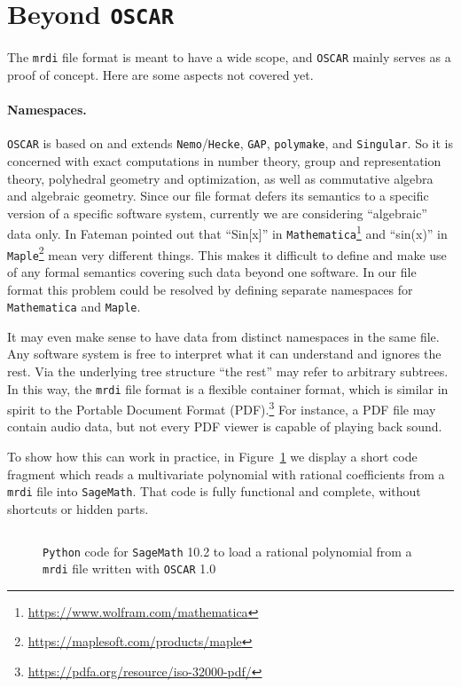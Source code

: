 \documentclass[runningheads]{llncs}
\newcommand\polymake{\texttt{polymake}\xspace}
\newcommand\OSCAR{\texttt{OSCAR}\xspace}
\newcommand\Python{\texttt{Python}\xspace}
\newcommand\Mathematica{\texttt{Mathematica}\xspace}
\newcommand\Maple{\texttt{Maple}\xspace}
\newcommand\Nemo{\texttt{Nemo}\xspace}
\newcommand\Hecke{\texttt{Hecke}\xspace}
\newcommand\GAP{\texttt{GAP}\xspace}
\newcommand\Singular{\texttt{Singular}\xspace}
\newcommand\SageMath{\texttt{SageMath}\xspace}
\begin{document}
\section{Beyond \OSCAR}
\label{sec:beyond}

The \texttt{mrdi} file format is meant to have a wide scope, and \OSCAR mainly serves as a proof of concept.
Here are some aspects not covered yet.
\paragraph{Namespaces.}
\OSCAR is based on and extends \Nemo/\Hecke \cite{nemo}, \GAP \cite{GAP4}, \polymake, and \Singular \cite{DGPS}.
So it is concerned with exact computations in number theory, group and representation theory, polyhedral geometry and optimization, as well as commutative algebra and algebraic geometry. 
Since our file format defers its semantics to a specific version of a specific software system, currently we are considering \enquote{algebraic} data only.
In \cite{Fateman:2001} Fateman pointed out that \enquote{Sin[x]} in \Mathematica\footnote{\url{https://www.wolfram.com/mathematica}} and \enquote{sin(x)} in \Maple\footnote{\url{https://maplesoft.com/products/maple}} mean very different things.
This makes it difficult to define and make use of any formal semantics covering such data beyond one software.
In our file format this problem could be resolved by defining separate namespaces for \Mathematica and \Maple.

It may even make sense to have data from distinct namespaces in the same file.
Any software system is free to interpret what it can understand and ignores the rest.
Via the underlying tree structure \enquote{the rest} may refer to arbitrary subtrees.
In this way, the \texttt{mrdi} file format is a flexible container format, which is similar in spirit to the Portable Document Format (PDF).\footnote{\url{https://pdfa.org/resource/iso-32000-pdf/}}
For instance, a PDF file may contain audio data, but not every PDF viewer is capable of playing back sound.

To show how this can work in practice, in Figure~\ref{fig:sage} we display a short code fragment which reads a multivariate polynomial with rational coefficients from a \texttt{mrdi} file into \SageMath \cite{william_stein_2020_4066866}.
That code is fully functional and complete, without shortcuts or hidden parts.

\begin{figure}[th]
  \inputminted[fontsize=\footnotesize]{py}{load_oscar_polynomial.py}
  \caption{\Python code for \SageMath 10.2 to load a rational polynomial from a \texttt{mrdi} file written with \OSCAR 1.0}
  \label{fig:sage}
\end{figure}
\end{document}
